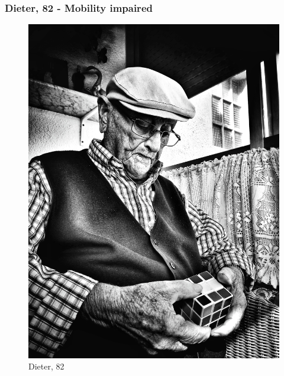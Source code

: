 \documentclass[plainarticle,zihtitle,english,final,hyperref,utf8]{zihpub}
\begin{document}
\subsubsection{Dieter, 82 - Mobility impaired}
\begin{figure}[h!]
  \begin{center}
    \includegraphics[height=.65\textwidth]{Dieter.jpg}
    \caption{Dieter, 82 \cite{dieter}}
    \label{fig:dieter}
  \end{center}
\end{figure}
\end{document}
